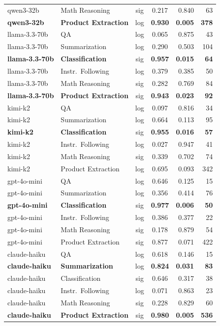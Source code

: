 \begin{table}[h]
\begin{tabular}{llccrr}
qwen3-32b     & Math Reasoning     & sig & 0.217 & 0.840 & 63  \\
\textbf{qwen3-32b}     & \textbf{Product Extraction} & log & \textbf{0.930} & \textbf{0.005} & \textbf{378} \\
\midrule
llama-3.3-70b & QA                 & log & 0.065 & 0.875 & 43  \\
llama-3.3-70b & Summarization      & log & 0.290 & 0.503 & 104 \\
\textbf{llama-3.3-70b} & \textbf{Classification}    & sig & \textbf{0.957} & \textbf{0.015} & \textbf{64}  \\
llama-3.3-70b & Instr.\ Following  & log & 0.379 & 0.385 & 50  \\
llama-3.3-70b & Math Reasoning     & sig & 0.282 & 0.769 & 84  \\
\textbf{llama-3.3-70b} & \textbf{Product Extraction} & sig & \textbf{0.943} & \textbf{0.023} & \textbf{92}  \\
\midrule
kimi-k2       & QA                 & log & 0.097 & 0.816 & 34  \\
kimi-k2       & Summarization      & log & 0.664 & 0.113 & 95  \\
\textbf{kimi-k2}       & \textbf{Classification}    & sig & \textbf{0.955} & \textbf{0.016} & \textbf{57}  \\
kimi-k2       & Instr.\ Following  & log & 0.027 & 0.947 & 41  \\
kimi-k2       & Math Reasoning     & sig & 0.339 & 0.702 & 74  \\
kimi-k2       & Product Extraction & log & 0.695 & 0.093 & 342 \\
\midrule
gpt-4o-mini   & QA                 & log & 0.646 & 0.125 & 15  \\
gpt-4o-mini   & Summarization      & log & 0.356 & 0.414 & 76  \\
\textbf{gpt-4o-mini}   & \textbf{Classification}    & sig & \textbf{0.977} & \textbf{0.006} & \textbf{50}  \\
gpt-4o-mini   & Instr.\ Following  & log & 0.386 & 0.377 & 22  \\
gpt-4o-mini   & Math Reasoning     & sig & 0.178 & 0.879 & 54  \\
gpt-4o-mini   & Product Extraction & sig & 0.877 & 0.071 & 422 \\
\midrule
claude-haiku  & QA                 & log & 0.618 & 0.146 & 15  \\
\textbf{claude-haiku}  & \textbf{Summarization}     & log & \textbf{0.824} & \textbf{0.031} & \textbf{83}  \\
claude-haiku  & Classification     & sig & 0.646 & 0.317 & 38  \\
claude-haiku  & Instr.\ Following  & log & 0.071 & 0.863 & 23  \\
claude-haiku  & Math Reasoning     & sig & 0.228 & 0.829 & 60  \\
\textbf{claude-haiku}  & \textbf{Product Extraction} & sig & \textbf{0.980} & \textbf{0.005} & \textbf{536} \\
\bottomrule
\end{tabular}
\end{table}

